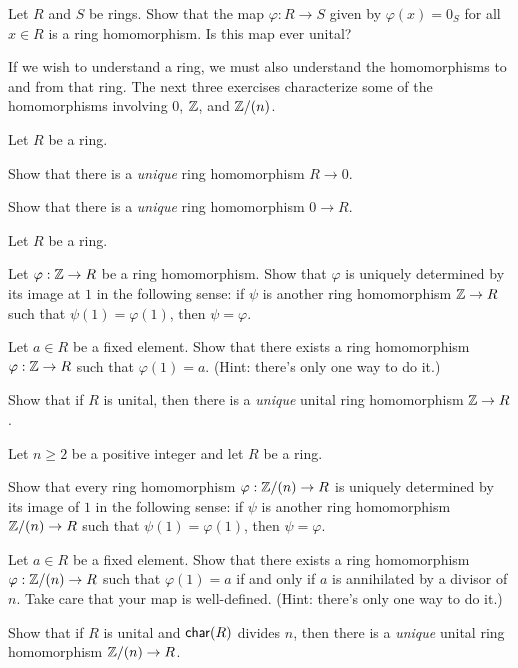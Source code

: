 \begin{exercise}
Let \(R\) and \(S\) be rings. Show that the map \(\varphi : R \rightarrow S\) given by \(\varphi(x) = 0_S\) for all \(x \in R\) is a ring homomorphism. Is this map ever unital?
\end{exercise}

If we wish to understand a ring, we must also understand the homomorphisms to and from that ring. The next three exercises characterize some of the homomorphisms involving $0$, $\mathbb{Z}$, and $\mathbb{Z}/(n)$.

\begin{exercise}
Let \(R\) be a ring.
\begin{proplist*}
\item Show that there is a \emph{unique} ring homomorphism \(R \rightarrow 0\).
\item Show that there is a \emph{unique} ring homomorphism \(0 \rightarrow R\).
\end{proplist*}
\end{exercise}

\begin{exercise} \label{exerc:homs-from-zz}
Let \(R\) be a ring.
\begin{proplist}
\item Let \(\varphi : \mathbb{Z} \rightarrow R\) be a ring homomorphism. Show that \(\varphi\) is uniquely determined by its image at \(1\) in the following sense: if \(\psi\) is another ring homomorphism \(\mathbb{Z} \rightarrow R\) such that \(\psi(1) = \varphi(1)\), then \(\psi = \varphi\).
\item Let \(a \in R\) be a fixed element. Show that there exists a ring homomorphism \(\varphi : \mathbb{Z} \rightarrow R\) such that \(\varphi(1) = a\). (Hint: there's only one way to do it.)
\item Show that if \(R\) is unital, then there is a \emph{unique} unital ring homomorphism \(\mathbb{Z} \rightarrow R\).
\end{proplist}
\end{exercise}

\begin{exercise} \label{exerc:homs-from-zzn}
Let \(n \geq 2\) be a positive integer and let \(R\) be a ring.
\begin{proplist}
\item Show that every ring homomorphism \(\varphi : \mathbb{Z}/(n) \rightarrow R\) is uniquely determined by its image of \(1\) in the following sense: if \(\psi\) is another ring homomorphism \(\mathbb{Z}/(n) \rightarrow R\) such that \(\psi(1) = \varphi(1)\), then \(\psi = \varphi\).
\item Let \(a \in R\) be a fixed element. Show that there exists a ring homomorphism \(\varphi : \mathbb{Z}/(n) \rightarrow R\) such that \(\varphi(1) = a\) if and only if \(a\) is annihilated by a divisor of \(n\). Take care that your map is well-defined. (Hint: there's only one way to do it.)
\item Show that if \(R\) is unital and \(\mathsf{char}(R)\) divides \(n\), then there is a \emph{unique} unital ring homomorphism \(\mathbb{Z}/(n) \rightarrow R\).
\end{proplist}
\end{exercise}

